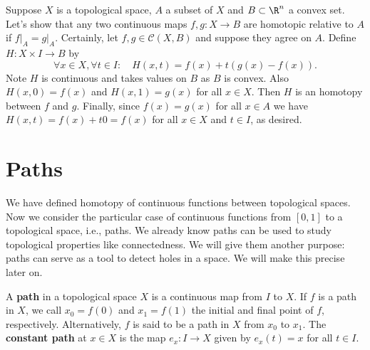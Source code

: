 \begin{example}
    


Suppose \(X\) is a topological space, \(A \) a subset of \(X\) and  \(B\subset \R^n\) a  convex set. Let's show that any two continuous maps \(f,g\colon X\to B\) are homotopic relative to \(A\) if \(f\rvert_{A} = g\rvert_A\). Certainly, let \(f,g\in \mathcal{C}(X,B)\)   and suppose they agree on \(A\). Define \(H\colon X\times I\to B\) by \[
    \forall x\in X,\forall t\in I:\quad H(x,t) = f(x) + t(g(x) - f(x)).
\] Note \(H\) is continuous and takes values on \(B\) as \(B\) is convex. Also \(H(x,0) = f(x)\) and \(H(x,1) = g(x)\) for all \(x\in X\).
Then \(H\) is an homotopy between \(f\) and \(g\).  Finally, since \(f(x) = g(x)\) for all \(x\in A\) we have \(H(x,t) = f(x) + t 0 = f(x)\) for all \(x\in X\) and \(t\in I\), as desired. 
\end{example}




\section{Paths}

We have defined homotopy of continuous functions between topological spaces. Now we consider  the particular case of continuous functions from \([0,1]\) to a topological space, i.e., paths. We already know paths can be used to study topological properties like connectedness. We will give them another purpose: paths can serve as a tool to detect holes in a space. We will make this precise later on.

\begin{definition}[Path]
    A \textbf{path} in a topological space \(X\) is a continuous map from \(I\) to \(X\). If \(f\) is a path in \(X\), we call \(x_0=f(0)\) and \(x_1=f(1)\) the initial and final point of \(f\), respectively. Alternatively, \(f\) is said to be a path in \(X\) from \(x_0\) to \(x_1\).
    The \textbf{constant path} at \(x\in X\) is the map \(e_{x}\colon I\to X\) given by \(e_x (t) = x\) for all \(t\in I\).
\end{definition}

